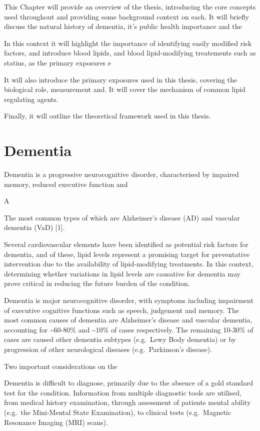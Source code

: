 \documentclass[a4paper, twoside]{templates/ociamthesis}
\begin{document}
This Chapter will provide an overview of the thesis, introducing the core concepts used throughout and providing some background context on each. It will briefly discuss the natural history of dementia, it's public health importance and the

In this context it will highlight the importance of identifying easily modified risk factors, and introduce blood lipids, and blood lipid-modifying treatements such as statins, as the primary exposures e

It will also introduce the primary exposures used in this thesis, covering the biological role, measurement and. It will cover the mechanism of common lipid regulating agents.

Finally, it will outline the theoretical framework used in this thesis.

\hypertarget{dementia}{%
\section{Dementia}\label{dementia}}

Dementia is a progressive neurocognitive disorder, characterised by impaired memory, reduced executive function and

A

The most common types of which are Alzheimer's disease (AD) and vascular dementia (VaD) {[}1{]}.

Several cardiovascular elements have been identified as potential risk factors for dementia, and of these, lipid levels represent a promising target for preventative intervention due to the availability of lipid-modifying treatments. In this context, determining whether variations in lipid levels are causative for dementia may prove critical in reducing the future burden of the condition.

Dementia is major neurocognitive disorder, with symptoms including impairment of executive cognitive functions such as speech, judgement and memory. The most common causes of dementia are Alzheimer's disease and vascular dementia, accounting for \textasciitilde60-80\% and \textasciitilde10\% of cases respectively. The remaining 10-30\% of cases are caused other dementia subtypes (e.g.~Lewy Body dementia) or by progression of other neurological diseases (e.g.~Parkinson's disease).

Two important considerations on the

Dementia is difficult to diagnose, primarily due to the absence of a gold standard test for the condition. Information from multiple diagnostic tools are utilised, from medical history examination, through assessment of patients mental ability (e.g.~the Mini-Mental State Examination), to clinical tests (e.g.~Magnetic Resonance Imaging (MRI) scans).
\end{document}
